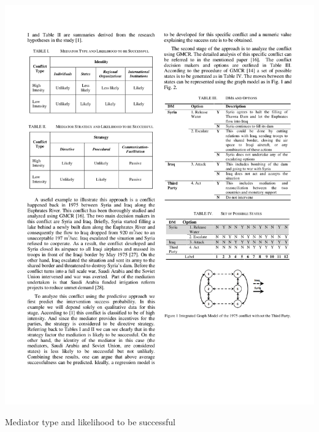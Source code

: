 \documentclass[letterpaper,12pt,titlepage,oneside,final]{book}
\begin{document}
\begin{center}

\begin{table}[H]
\centering
\includegraphics[scale=1]{PDF-IMG/MEDIATOR_TYPE.pdf}

\caption{Mediator type and likelihood to be successful}

\label{tbl:MEDIATOR_TYPE}
\end{table}

\end{center}
\end{document}
